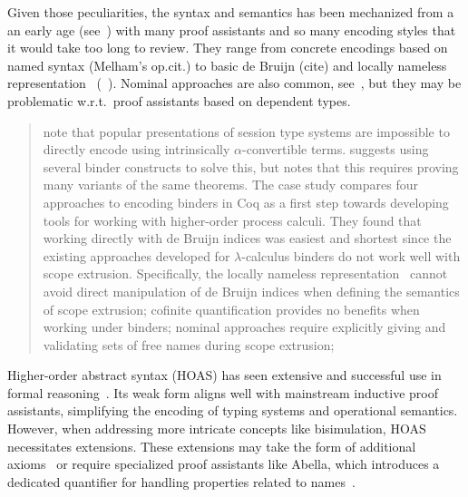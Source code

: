 \documentclass[runningheads]{llncs}
\begin{document}
Given those peculiarities, the syntax and semantics has been
mechanized from a an early age (see~\cite{Melham94}) with many proof
assistants and so many encoding styles that it would take too long to
review.  They range from concrete encodings based on named syntax
(Melham's op.cit.) to basic de Bruijn (cite) and locally nameless
representation~\cite{Chargueraud2012} (\eg~\cite{Castro2020}).
Nominal approaches are also common, see~\cite{Bengtson2009}, but they
may be problematic w.r.t.~proof assistants based on dependent types.

\begin{quotation}
\cite{Castro-Perez2021,Castro2020} note that popular presentations of
session type systems are impossible to directly encode using
intrinsically \(\alpha\)-convertible terms.  \cite{Castro2020}
suggests using several binder constructs to solve this, but notes that
this requires proving many variants of the same theorems.
The case study \cite{AmbalLS21} compares four approaches to encoding
binders in Coq as a first step towards developing tools for working
with higher-order process calculi.  They found that working directly
with de Bruijn indices was easiest and shortest since the existing
approaches developed for $\lambda$-calculus binders do not work well
with scope extrusion.  Specifically, the locally nameless
representation~\cite{Chargueraud2012} cannot avoid direct manipulation
of de Bruijn indices when defining the semantics of scope extrusion;
cofinite quantification provides no benefits when working under
binders; nominal approaches require explicitly giving
and validating sets of free names during scope extrusion;
\end{quotation}


Higher-order abstract syntax (HOAS) has seen extensive and successful
use in formal reasoning~\cite{Despeyroux2000,Honsell2001,Tiu2010}. Its
weak form aligns well with mainstream inductive proof assistants,
simplifying the encoding of typing systems and operational
semantics. However, when addressing more intricate concepts like
bisimulation, HOAS necessitates extensions. These extensions may take
the form of additional axioms~\cite{Honsell2001} or require specialized proof assistants
like Abella, which introduces a dedicated quantifier for handling
properties related to names~\cite{GacekMN11}.

\end{document}
